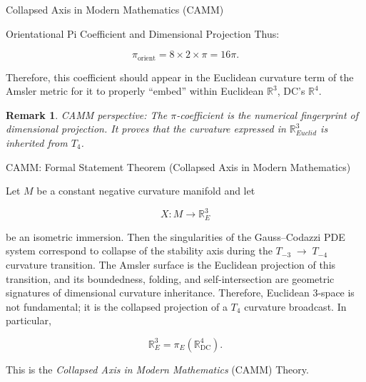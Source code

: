 \documentclass[final,onefignum,onetabnum]{siamart}
\newtheorem{remark}{Remark}
\begin{document}
\begin{section}{Collapsed Axis in Modern Mathematics (CAMM)}
\begin{subsection}{Orientational Pi Coefficient and Dimensional Projection}
Thus:


\[
\pi_{\text{orient}} = 8 \times 2 \times \pi = 16\pi.
\]


Therefore, this coefficient should appear in the Euclidean curvature term of the Amsler metric for it to properly ``embed'' within Euclidean $\mathbb{R}^3$, DC's $\mathbb{R}^4.$

\begin{remark}
CAMM perspective: The $\pi$-coefficient is the numerical fingerprint of dimensional projection. It proves that the curvature expressed in $\mathbb{R}_{Euclid}^3$ is inherited from $T_4$.
\end{remark}
\end{subsection}

\begin{subsection}{CAMM: Formal Statement Theorem (Collapsed Axis in Modern Mathematics)}

Let $M$ be a constant negative curvature manifold and let 


\[
X : M \longrightarrow \mathbb{R}_{E}^{3}
\]


be an isometric immersion. Then the singularities of the Gauss--Codazzi PDE system correspond to collapse of the stability axis during the $T_{-3} \;\longrightarrow\; T_{-4}$ curvature transition. The Amsler surface is the Euclidean projection of this transition, and its boundedness, folding, and self-intersection are geometric signatures of dimensional curvature inheritance. Therefore, Euclidean $3$-space is not fundamental; it is the collapsed projection of a $T_{4}$ curvature broadcast. In particular,


\[
\mathbb{R}_{E}^{3} = \pi_{E}\!\left( \mathbb{R}_{\mathrm{DC}}^{4} \right).
\]


This is the \emph{Collapsed Axis in Modern Mathematics} (CAMM) Theory.
\end{subsection}
\end{section}
\end{document}
